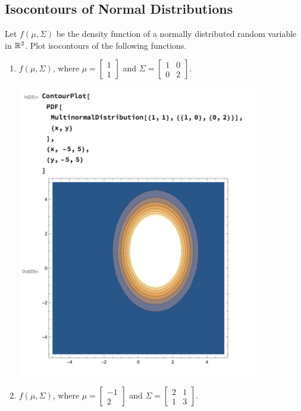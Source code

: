\subsection{Isocontours of Normal Distributions}
Let $f(\mu, \Sigma)$ be the density function of a normally distributed random variable in $\mathbb{R}^2$. Plot isocontours of the following functions.
\begin{enumerate}[label=(\alph*)]
    \item $f(\mu, \Sigma)$, where $\mu = \begin{bmatrix}1 \\ 1 \end{bmatrix}$ and $\Sigma = \begin{bmatrix} 1 & 0  \\ 0 & 2 \end{bmatrix}$.
    \begin{mdframed}
      \includegraphics[width=300pt]{img/hw03_2a.png}
    \end{mdframed}
    \newpage
    \item $f(\mu, \Sigma)$, where $\mu = \begin{bmatrix}-1 \\ 2 \end{bmatrix}$ and $\Sigma = \begin{bmatrix} 2 & 1  \\ 1 & 3 \end{bmatrix}$.

\end{enumerate}
